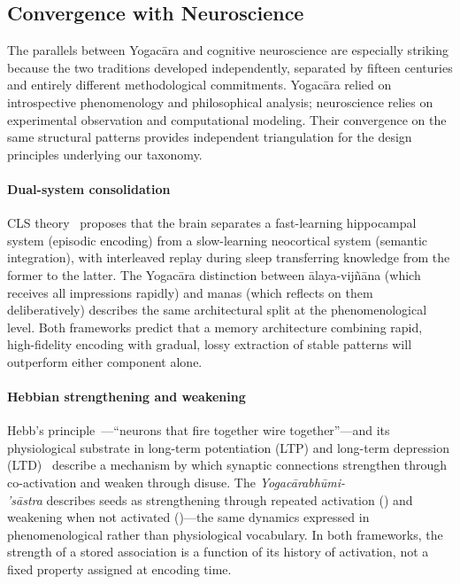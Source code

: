 \subsection{Convergence with Neuroscience}
\label{sec:yogacara-neuroscience}

The parallels between Yogac\=ara and cognitive neuroscience are
especially striking because the two traditions developed independently,
separated by fifteen centuries and entirely different methodological
commitments.  Yogac\=ara relied on introspective phenomenology and
philosophical analysis; neuroscience relies on experimental observation
and computational modeling.  Their convergence on the same structural
patterns provides independent triangulation for the design principles
underlying our taxonomy.

\paragraph{Dual-system consolidation}
CLS theory~\cite{mcclelland1995} proposes that the brain separates a
fast-learning hippocampal system (episodic encoding) from a
slow-learning neocortical system (semantic integration), with
interleaved replay during sleep transferring knowledge from the former
to the latter.  The Yogac\=ara distinction between \=alaya-vij\~n\=ana
(which receives all impressions rapidly) and manas (which reflects on
them deliberatively) describes the same architectural split at the
phenomenological level.  Both frameworks predict that a memory
architecture combining rapid, high-fidelity encoding with gradual,
lossy extraction of stable patterns will outperform either component
alone.

\paragraph{Hebbian strengthening and weakening}
Hebb's principle~\cite{hebb1949}---``neurons that fire together wire
together''---and its physiological substrate in long-term potentiation
(LTP) and long-term depression (LTD)~\cite{bliss1973} describe a
mechanism by which synaptic connections strengthen through co-activation
and weaken through disuse.  The \emph{Yogac\=arabh\=umi-\\'s\=astra}
describes seeds as strengthening through repeated activation ()
and weakening when not activated ()---the same dynamics
expressed in phenomenological rather than physiological vocabulary.
In both frameworks, the strength of a stored association is a function
of its history of activation, not a fixed property assigned at encoding
time.

